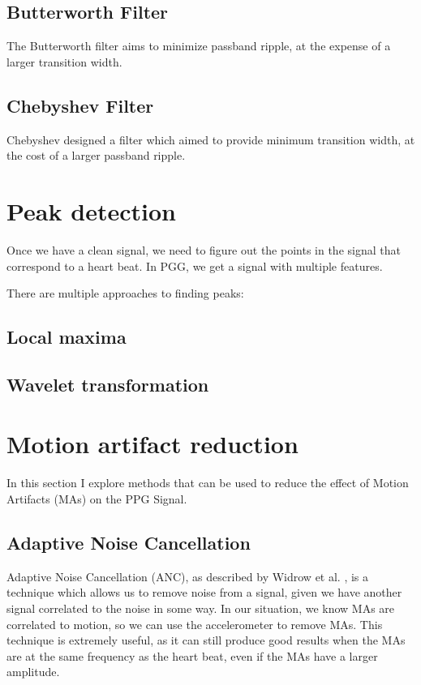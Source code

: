 \documentclass[12pt,a4paper,twoside,openright]{report}
\begin{document}
\subsection{Butterworth Filter}

The Butterworth filter aims to minimize passband ripple, at the expense of a
larger transition width. 

\subsection{Chebyshev Filter}

Chebyshev designed a filter which aimed to provide minimum transition width,
at the cost of a larger passband ripple.

\section{Peak detection}

Once we have a clean signal, we need to figure out the points in the signal
that correspond to a heart beat. In PGG, we get a signal with multiple
features.

There are multiple approaches to finding peaks:

\subsection{Local maxima}
\subsection{Wavelet transformation}


\section{Motion artifact reduction}

In this section I explore methods that can be used to reduce the effect of 
Motion Artifacts (MAs) on the PPG Signal.

\subsection{Adaptive Noise Cancellation}

Adaptive Noise Cancellation (ANC), as described by Widrow et al.
\cite{Widrow75}, is a technique which allows us to remove noise from a signal,
given we have another signal correlated to the noise in some way. In our 
situation, we know MAs are correlated to motion, so we can use the 
accelerometer to remove MAs. This technique is extremely useful, as it can 
still produce good results when the MAs are at the same frequency as the heart
beat, even if the MAs have a larger amplitude.
\end{document}
